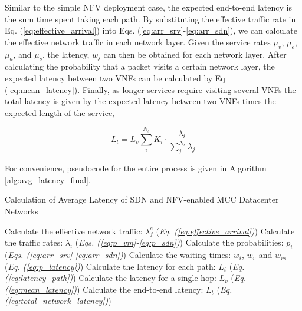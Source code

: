 Similar to the simple NFV deployment case, the expected end-to-end latency is the sum time spent taking each path. By substituting the effective traffic rate in Eq. (\ref{eq:effective_arrival}) into Eqs. (\ref{eq:arr_srv}-\ref{eq:arr_sdn}), we can calculate the effective network traffic in each network layer. Given the service rates $\mu_v$, $\mu_e$, $\mu_a$, and $\mu_s$, the latency, $w_j$ can then be obtained for each network layer. After calculating the probability that a packet visits a certain network layer, the expected latency between two VNFs can be calculated by Eq (\ref{eq:mean_latency}). Finally, as longer services require visiting several VNFs the total latency is given by the expected latency between two VNFs times the expected length of the service,

\begin{equation}
    \label{eq:total_network_latency}
    L_t = L_v \sum_i^{N_s} K_i \cdot \frac{\lambda_i}{\sum_j^{N_s} \lambda_j}
\end{equation}

For convenience, pseudocode for the entire process is given in Algorithm \ref{alg:avg_latency_final}.

\begin{algorithm}

    \caption{Calculation of Average Latency of SDN and NFV-enabled MCC Datacenter Networks}
    \label{alg:avg_latency_final}

    \begin{algorithmic}[1]
        \STATE Calculate the effective network traffic: $\lambda_f^e$ \hfill(\textit{Eq. (\ref{eq:effective_arrival})})
        \STATE Calculate the traffic rates: $\lambda_i$ \hfill(\textit{Eqs. (\ref{eq:p_vm}-\ref{eq:p_sdn})})
        \STATE Calculate the probabilities: $p_i$ \hfill(\textit{Eqs. (\ref{eq:arr_srv}-\ref{eq:arr_sdn})})
        \STATE Calculate the waiting times: $w_i$, $w_v$ and $w_{vs}$ \hfill(\textit{Eq. (\ref{eq:p_latency})})
        \STATE Calculate the latency for each path: $L_i$ \hfill (\textit{Eq. (\ref{eq:latency_path})})
        \STATE Calculate the latency for a single hop: $L_v$ \hfill (\textit{Eq. (\ref{eq:mean_latency})})
        \STATE Calculate the end-to-end latency: $L_t$ \hfill (\textit{Eq. (\ref{eq:total_network_latency})})
    \end{algorithmic}
\end{algorithm}
